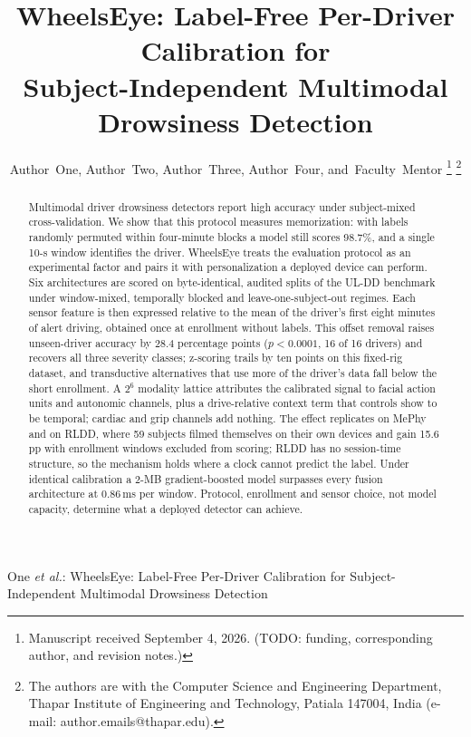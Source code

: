 \documentclass[journal]{IEEEtran}
\newcommand{\pp}{\,pp}
\newcommand{\sysname}{WheelsEye}
\begin{document}
\title{\sysname: Label-Free Per-Driver Calibration for\\
Subject-Independent Multimodal Drowsiness Detection}

\author{Author~One, Author~Two, Author~Three, Author~Four, and~Faculty~Mentor%
\thanks{Manuscript received September 4, 2026. (TODO: funding, corresponding
author, and revision notes.)}%
\thanks{The authors are with the Computer Science and Engineering Department,
Thapar Institute of Engineering and Technology, Patiala 147004, India
(e-mail: author.emails@thapar.edu).}}

%
{One \MakeLowercase{\textit{et al.}}: \sysname: Label-Free Per-Driver Calibration for Subject-Independent Multimodal Drowsiness Detection}

\maketitle

\begin{abstract}
Multimodal driver drowsiness detectors report high accuracy under
subject-mixed cross-validation. We show that this protocol measures
memorization: with labels randomly permuted within four-minute blocks a model
still scores 98.7\%, and a single 10-s window identifies the driver. \sysname{} treats the
evaluation protocol as an experimental factor and pairs it with personalization
a deployed device can perform. Six
architectures are scored on byte-identical, audited splits of the UL-DD
benchmark under window-mixed, temporally blocked and leave-one-subject-out
regimes. Each sensor feature is then expressed relative to the mean of the
driver's first eight minutes of alert driving, obtained once at enrollment
without labels. This offset removal raises unseen-driver accuracy
by 28.4 percentage points ($p<0.0001$, 16 of 16 drivers) and recovers all
three severity classes; z-scoring trails by ten points on this fixed-rig
dataset, and transductive alternatives that use more of the driver's data fall
below the short enrollment. A $2^{6}$ modality lattice attributes the
calibrated signal to facial action units and autonomic channels, plus a
drive-relative context term that controls show to be temporal; cardiac and
grip channels add nothing. The effect
replicates on MePhy and on RLDD, where 59 subjects filmed themselves on their
own devices and gain 15.6\pp{} with enrollment windows excluded from scoring;
RLDD has no session-time structure, so the mechanism holds where a clock cannot
predict the label. Under identical calibration a 2-MB
gradient-boosted model surpasses every fusion architecture at 0.86\,ms per
window. Protocol, enrollment and sensor choice, not model capacity, determine
what a deployed detector can achieve.
\end{abstract}
\end{document}
